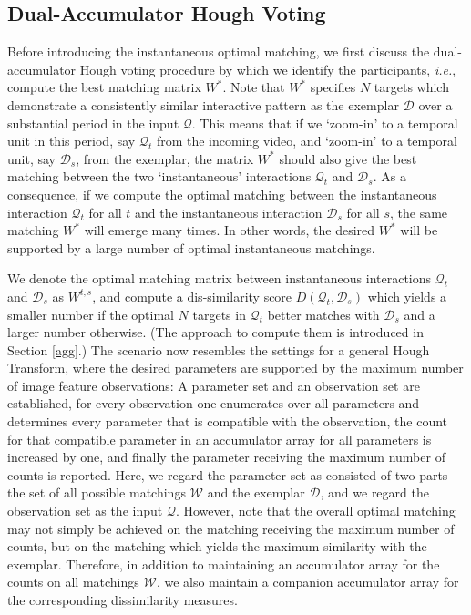 \subsection{Dual-Accumulator Hough Voting}
\label{vote}

Before introducing the instantaneous optimal matching, we first discuss the dual-accumulator Hough voting procedure by which we identify the participants, \textit{i.e.}, compute the best matching matrix $W^{*}$. Note that  $W^{*}$ specifies $N$ targets which demonstrate a consistently similar interactive pattern as the exemplar $\mathcal{D}$ over a substantial period in the input $\mathcal{Q}$. This means that if we `zoom-in' to a temporal unit in this period, say $\mathcal{Q}_{t}$ from the incoming video, and `zoom-in' to a temporal unit, say $\mathcal{D}_{s}$, from the exemplar, the matrix $W^{*}$ should also give the best matching between the two `instantaneous' interactions $\mathcal{Q}_{t}$ and $\mathcal{D}_{s}$. As a consequence, if we compute the optimal matching between the instantaneous interaction $\mathcal{Q}_{t}$ for all $t$ and the instantaneous interaction $\mathcal{D}_{s}$ for all $s$, the same matching $W^{*}$ will emerge many times. In other words, the desired $W^{*}$ will be supported by a large number of optimal instantaneous matchings. 

We denote the optimal matching matrix between instantaneous interactions $\mathcal{Q}_{t}$ and $\mathcal{D}_{s}$ as $W^{t,s}$, and compute a dis-similarity score $D(\mathcal{Q}_{t}, \mathcal{D}_{s})$ which yields a smaller number if the optimal $N$ targets in $\mathcal{Q}_{t}$ better matches with $\mathcal{D}_{s}$ and a larger number otherwise. (The approach to compute them is introduced in Section \ref{agg}.) The scenario now resembles the settings for a general Hough Transform, where the desired parameters are supported by the maximum number of image feature observations: A parameter set and an observation set are established, for every observation one enumerates over all parameters and determines every parameter that is compatible with the observation, the count for that compatible parameter in an accumulator array for all parameters is increased by one, and finally the parameter receiving the maximum number of counts is reported. Here, we regard the parameter set as consisted of two parts - the set of all possible matchings $\mathcal{W}$ and the exemplar $\mathcal{D}$, and we regard the observation set as the input $\mathcal{Q}$. However, note that the overall optimal matching may not simply be achieved on the matching receiving the maximum number of counts, but on the matching which yields the maximum similarity with the exemplar. Therefore, in addition to maintaining an accumulator array for the counts on all matchings $\mathcal{W}$, we also maintain a companion accumulator array for the corresponding dissimilarity measures. 

